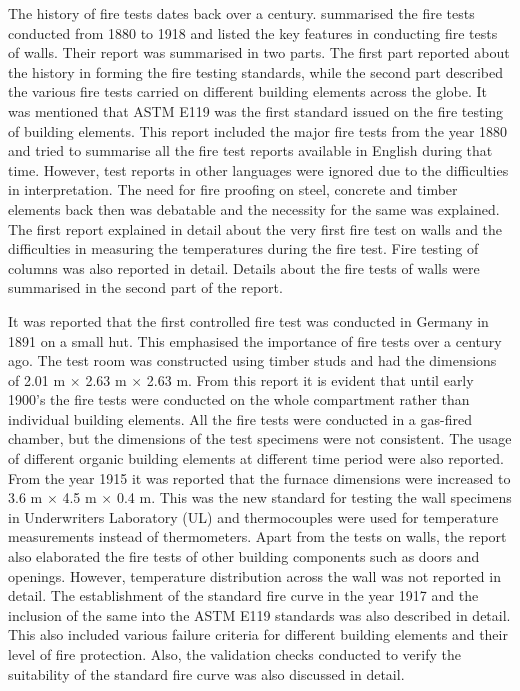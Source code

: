 The history of fire tests dates back over a century. \citet{Babrauskas1978} summarised the fire tests conducted from 1880 to 1918 and listed the key features in conducting fire tests of walls. Their report was summarised in two parts. The first part reported about the history in forming the fire testing standards, while the second part described the various fire tests carried on different building elements across the globe. It was mentioned that ASTM E119 was the first standard issued on the fire testing of building elements. This report included the major fire tests from the year 1880 and tried to summarise all the fire test reports available in English during that time. However, test reports in other languages were ignored due to the difficulties in interpretation. The need for fire proofing on steel, concrete and timber elements back then was debatable and the necessity for the same was explained. The first report explained in detail about the very first fire test on walls and the difficulties in measuring the temperatures during the fire test. Fire testing of columns was also reported in detail. Details about the fire tests of walls were summarised in the second part of the report.  

It was reported that the first controlled fire test was conducted in Germany in 1891 on a small hut. This emphasised the importance of fire tests over a century ago. The test room was constructed using timber studs and had the dimensions of 2.01 m $\times$ 2.63 m $\times$ 2.63 m. From this report it is evident that until early 1900's the fire tests were conducted on the whole compartment rather than individual building elements. All the fire tests were conducted in a gas-fired chamber, but the dimensions of the test specimens were not consistent. The usage of different organic building elements at different time period were also reported. From the year 1915 it was reported that the furnace dimensions were increased to 3.6 m $\times$ 4.5 m $\times$ 0.4 m. This was the new standard for testing the wall specimens in Underwriters Laboratory (UL) and thermocouples were used for temperature measurements instead of thermometers. Apart from the tests on walls, the report also elaborated the fire tests of other building components such as doors and openings. However, temperature distribution across the wall was not reported in detail. The establishment of the standard fire curve in the year 1917 and the inclusion of the same into the ASTM E119 standards was also described in detail. This also included various failure criteria for different building elements and their level of fire protection. Also, the validation checks conducted to verify the suitability of the standard fire curve was also discussed in detail.

